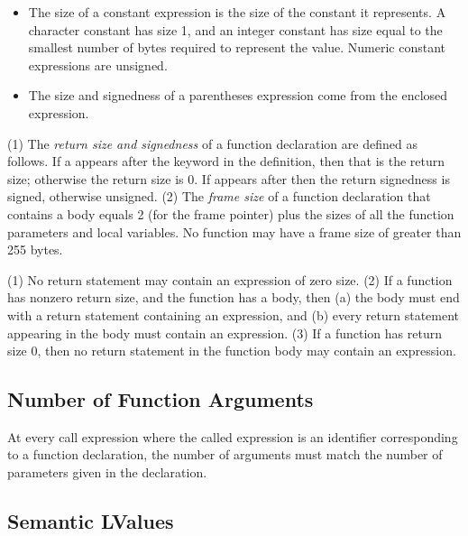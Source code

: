 \documentclass[10pt]{article}
\begin{document}
\begin{itemize}
  a unop expression come from the operand, except that (1) an address
  operation  is two bytes unsigned, and (2) a negation
  operation is signed.
%
\item {} The size of a constant expression is
  the size of the constant it represents.  A character constant has
  size 1, and an integer constant has size equal to the smallest
  number of bytes required to represent the value.  Numeric constant
  expressions are unsigned.
%
\item {} The size and signedness of a
  parentheses expression come from the enclosed expression.
%
\end{itemize}

 (1) The \emph{return size and
  signedness} of a function declaration are defined as follows.  If a
 appears after the keyword  in the definition,
then that is the return size; otherwise the return size is 0.  If
 appears after  then the return signedness is
signed, otherwise unsigned. (2) The \emph{frame size} of a function
declaration that contains a body equals 2 (for the frame pointer) plus
the sizes of all the function parameters and local variables.  No
function may have a frame size of greater than 255 bytes.

 (1) No return statement may contain an
expression of zero size.  (2) If a function has nonzero return size,
and the function has a body, then (a) the body must end with a return
statement containing an expression, and (b) every return statement
appearing in the body must contain an expression.  (3) If a function
has return size 0, then no return statement in the function body may
contain an expression.


\subsection{Number of Function Arguments}
\label{sec:semantics:fn-args}

At every call expression where the called expression is an identifier
corresponding to a function declaration, the number of arguments must
match the number of parameters given in the declaration.

\subsection{Semantic LValues}
\label{sec:semantics:lvalues}
\end{document}
